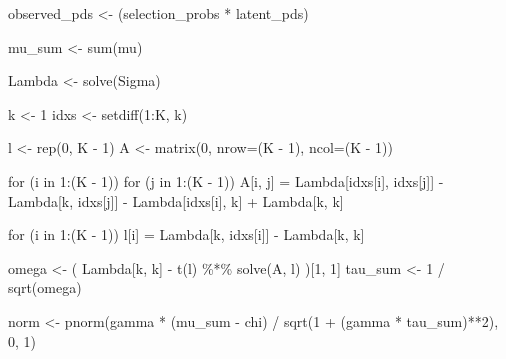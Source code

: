 \documentclass[
  letterpaper,
  DIV=11,
  numbers=noendperiod]{scrartcl}
\newenvironment{Shaded}{\begin{snugshade}}{\end{snugshade}}
\newcommand{\AttributeTok}[1]{\textcolor[rgb]{0.40,0.45,0.13}{#1}}
\newcommand{\ControlFlowTok}[1]{\textcolor[rgb]{0.00,0.23,0.31}{#1}}
\newcommand{\DecValTok}[1]{\textcolor[rgb]{0.68,0.00,0.00}{#1}}
\newcommand{\FunctionTok}[1]{\textcolor[rgb]{0.28,0.35,0.67}{#1}}
\newcommand{\NormalTok}[1]{\textcolor[rgb]{0.00,0.23,0.31}{#1}}
\newcommand{\OtherTok}[1]{\textcolor[rgb]{0.00,0.23,0.31}{#1}}
\newcommand{\SpecialCharTok}[1]{\textcolor[rgb]{0.37,0.37,0.37}{#1}}
\begin{document}
\begin{Shaded}
\begin{Highlighting}[]
\NormalTok{observed\_pds }\OtherTok{\textless{}{-}}\NormalTok{ (selection\_probs }\SpecialCharTok{*}\NormalTok{ latent\_pds)}

\NormalTok{mu\_sum }\OtherTok{\textless{}{-}} \FunctionTok{sum}\NormalTok{(mu)}

\NormalTok{Lambda }\OtherTok{\textless{}{-}} \FunctionTok{solve}\NormalTok{(Sigma)}

\NormalTok{k }\OtherTok{\textless{}{-}} \DecValTok{1}
\NormalTok{idxs }\OtherTok{\textless{}{-}} \FunctionTok{setdiff}\NormalTok{(}\DecValTok{1}\SpecialCharTok{:}\NormalTok{K, k)}

\NormalTok{l }\OtherTok{\textless{}{-}} \FunctionTok{rep}\NormalTok{(}\DecValTok{0}\NormalTok{, K }\SpecialCharTok{{-}} \DecValTok{1}\NormalTok{)}
\NormalTok{A }\OtherTok{\textless{}{-}} \FunctionTok{matrix}\NormalTok{(}\DecValTok{0}\NormalTok{, }\AttributeTok{nrow=}\NormalTok{(K }\SpecialCharTok{{-}} \DecValTok{1}\NormalTok{), }\AttributeTok{ncol=}\NormalTok{(K }\SpecialCharTok{{-}} \DecValTok{1}\NormalTok{))}

\ControlFlowTok{for}\NormalTok{ (i }\ControlFlowTok{in} \DecValTok{1}\SpecialCharTok{:}\NormalTok{(K }\SpecialCharTok{{-}} \DecValTok{1}\NormalTok{))}
  \ControlFlowTok{for}\NormalTok{ (j }\ControlFlowTok{in} \DecValTok{1}\SpecialCharTok{:}\NormalTok{(K }\SpecialCharTok{{-}} \DecValTok{1}\NormalTok{))}
\NormalTok{    A[i, j] }\OtherTok{=}\NormalTok{ Lambda[idxs[i], idxs[j]] }\SpecialCharTok{{-}}
\NormalTok{              Lambda[k, idxs[j]] }\SpecialCharTok{{-}}
\NormalTok{              Lambda[idxs[i], k] }\SpecialCharTok{+}
\NormalTok{              Lambda[k, k]}

\ControlFlowTok{for}\NormalTok{ (i }\ControlFlowTok{in} \DecValTok{1}\SpecialCharTok{:}\NormalTok{(K }\SpecialCharTok{{-}} \DecValTok{1}\NormalTok{))}
\NormalTok{  l[i] }\OtherTok{=}\NormalTok{ Lambda[k, idxs[i]] }\SpecialCharTok{{-}}\NormalTok{ Lambda[k, k]}

\NormalTok{omega }\OtherTok{\textless{}{-}}\NormalTok{ ( Lambda[k, k] }\SpecialCharTok{{-}} \FunctionTok{t}\NormalTok{(l) }\SpecialCharTok{\%*\%} \FunctionTok{solve}\NormalTok{(A, l) )[}\DecValTok{1}\NormalTok{, }\DecValTok{1}\NormalTok{]}
\NormalTok{tau\_sum }\OtherTok{\textless{}{-}} \DecValTok{1} \SpecialCharTok{/} \FunctionTok{sqrt}\NormalTok{(omega)}

\NormalTok{norm }\OtherTok{\textless{}{-}} \FunctionTok{pnorm}\NormalTok{(gamma }\SpecialCharTok{*}\NormalTok{ (mu\_sum }\SpecialCharTok{{-}}\NormalTok{ chi) }\SpecialCharTok{/} \FunctionTok{sqrt}\NormalTok{(}\DecValTok{1} \SpecialCharTok{+}\NormalTok{ (gamma }\SpecialCharTok{*}\NormalTok{ tau\_sum)}\SpecialCharTok{**}\DecValTok{2}\NormalTok{), }\DecValTok{0}\NormalTok{, }\DecValTok{1}\NormalTok{)}


\end{Highlighting}
\end{Shaded}
\end{document}
